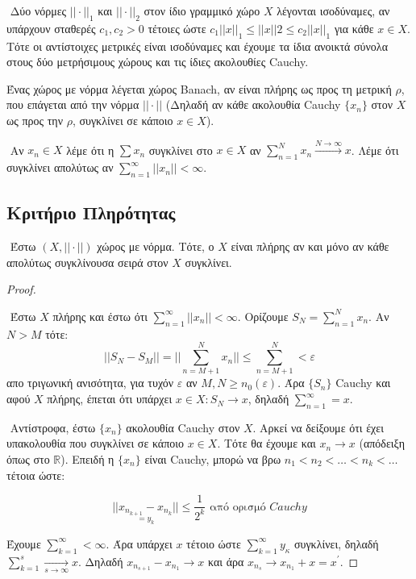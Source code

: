 $ $\newline
Δύο νόρμες $||\cdot||_1$ και $||\cdot||_2$ στον ίδιο γραμμικό χώρο $X$ λέγονται ισοδύναμες, αν υπάρχουν σταθερές $c_1,c_2 >0$ τέτοιες ώστε $c_1 ||x||_1 \leq ||x||2 \leq c_2 ||x||_1$ για κάθε $x \in X$. Τότε οι αντίστοιχες μετρικές είναι ισοδύναμες και έχουμε τα ίδια ανοικτά σύνολα στους δύο μετρήσιμους χώρους και τις ίδιες ακολουθίες {\eng Cauchy}.

\begin{definition}
    Ένας χώρος με νόρμα λέγεται χώρος {\eng Banach}, αν είναι πλήρης ως προς τη μετρική $\rho$, που επάγεται από την νόρμα $||\cdot ||$ (Δηλαδή αν κάθε ακολουθία {\eng Cauchy} $\{x_n\}$ στον $X$ ως προς την $\rho$, συγκλίνει σε κάποιο $x \in X$).
\end{definition}

$ $\newline
Αν $x_n \in X$ λέμε ότι η $\sum x_n$ συγκλίνει στο $x \in X$ αν $\sum\limits_{n=1}^N x_n \overset{ N\rightarrow \infty}{\longrightarrow } x$. Λέμε ότι συγκλίνει απολύτως αν $\sum\limits_{n=1}^{\infty} ||x_n|| < \infty$.

\subsection{ Κριτήριο Πληρότητας}

$ $\newline
Έστω $(X,||\cdot||)$ χώρος με νόρμα. Τότε, ο $X$ είναι πλήρης αν και μόνο αν κάθε απολύτως συγκλίνουσα σειρά στον $X$ συγκλίνει.

\begin{proof} $ $

    $ $\newline
    Έστω $X$ πλήρης και έστω ότι $\sum\limits_{n=1}^{\infty} ||x_n|| < \infty$. Ορίζουμε $S_N = \sum\limits_{n=1}^N x_n$. Αν $N > M$ τότε:
    $$|| S_N - S_M || = || \sum\limits_{n=M+1}^N x_n || \leq \sum\limits_{n = M+1}^N < \varepsilon$$ απο τριγωνική ανισότητα, για τυχόν $\varepsilon$ αν $M,N \geq n_0 (\varepsilon)$. Άρα $\{S_n\}$ {\eng Cauchy} και αφού $X$ πλήρης, έπεται ότι υπάρχει $x \in X: S_N \rightarrow x$, δηλαδή $\sum\limits_{n=1}^{\infty} = x$.

    $ $\newline
    Αντίστροφα, έστω $\{x_n\}$ ακολουθία {\eng Cauchy} στον $X$. Αρκεί να δείξουμε ότι έχει υπακολουθία που συγκλίνει σε κάποιο $x \in X$. Τότε θα έχουμε και $x_n \rightarrow x$ (απόδειξη όπως στο $\mathbb R$). Επειδή η $\{x_n\}$ είναι {\eng Cauchy}, μπορώ να βρω $n_1 < n_2 < \ldots < n_k <\ldots$ τέτοια ώστε:

    $$|| \underset{ = y_k }{x_{n_{k+1}} - x_{n_k}} || \leq \frac1{2^k} \text{ από ορισμό } Cauchy$$

    Έχουμε $\sum\limits_{k=1}^{\infty} < \infty$. Άρα υπάρχει $x$ τέτοιο ώστε $\sum\limits_{k=1}^{\infty} y_κ$ συγκλίνει, δηλαδή $\sum\limits_{k=1}^s \underset{s\rightarrow \infty}{\longrightarrow } x$. Δηλαδή $x_{n_{s+1}}-x_{n_1} \rightarrow x$ και άρα $x_{n_s} \rightarrow x_{n_1} + x = x^{\prime}$.
\end{proof}

